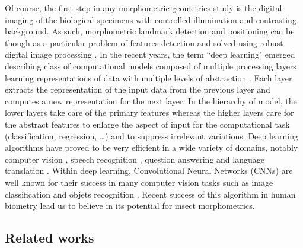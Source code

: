 \documentclass[review]{elsarticle}
\begin{document}
Of course, the first step in any morphometric geometrics study is the digital imaging of the biological specimens with controlled illumination and contrasting background. As such, morphometric landmark detection and positioning can be though as a particular problem of features detection and solved using robust digital image processing \cite{gonzalez_digital_2006}. In the recent years, the term ``deep learning" emerged describing class of computational models composed of multiple processing layers learning representations of data with multiple levels of abstraction \cite{lecun2015deep}. Each layer extracts the representation of the input data from the previous layer and computes a new representation for the next layer. In the hierarchy of model, the lower layers take care of the primary features whereas the higher layers care for the abstract features to enlarge the aspect of input for the computational task (classification, regression, \ldots) and to suppress irrelevant variations. Deep learning algorithms have proved to be very efficient in a wide variety of domains, notably computer vision \cite{krizhevsky2012imagenet, ciregan2012multi, szegedy2015going, li2015convolutional,tompson2014joint}, speech recognition \cite{mikolov2011strategies, hinton2012deep, sainath2013deep}, question answering \cite{bordes2014question} and language translation \cite{sutskever2014sequence, jean2014using}.
Within deep learning, Convolutional Neural Networks (CNNs) are well known for their success in many computer vision tasks such as image classification \cite{krizhevsky2012imagenet,ciregan2012multi} and  objets recognition \cite{li2015convolutional,tompson2014joint}.
Recent success of this algorithm in human biometry \cite{cintas2016automatic} lead us to believe in its potential for insect morphometrics.  


\subsection{Related works}\label{rw}
\end{document}
